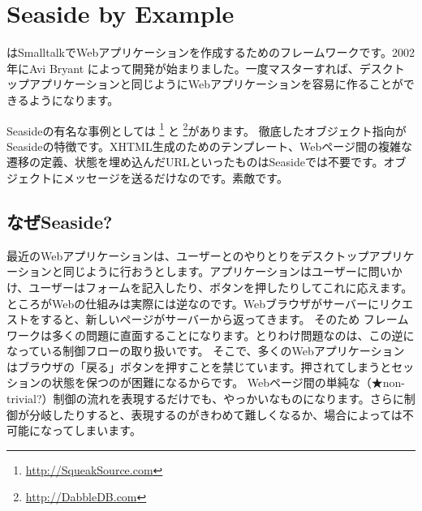 \documentclass[a4paper,10pt,twoside]{book}
\begin{document}
	\sloppy
\fi
\chapter{Seaside by Example}


 はSmalltalkでWebアプリケーションを作成するためのフレームワークです。2002年にAvi Bryant  によって開発が始まりました。一度マスターすれば、デスクトップアプリケーションと同じようにWebアプリケーションを容易に作ることができるようになります。

Seasideの有名な事例としては \footnote{\url{http://SqueakSource.com}} と \footnote{\url{http://DabbleDB.com}}があります。
徹底したオブジェクト指向がSeasideの特徴です。XHTML生成のためのテンプレート、Webページ間の複雑な遷移の定義、状態を埋め込んだURLといったものはSeasideでは不要です。オブジェクトにメッセージを送るだけなのです。素敵です。

\section{なぜSeaside?}

最近のWebアプリケーションは、ユーザーとのやりとりをデスクトップアプリケーションと同じように行おうとします。アプリケーションはユーザーに問いかけ、ユーザーはフォームを記入したり、ボタンを押したりしてこれに応えます。
ところがWebの仕組みは実際には逆なのです。Webブラウザがサーバーにリクエストをすると、新しいページがサーバーから返ってきます。
そのため フレームワークは多くの問題に直面することになります。とりわけ問題なのは、この逆になっている制御フローの取り扱いです。
そこで、多くのWebアプリケーションはブラウザの「戻る」ボタンを押すことを禁じています。押されてしまうとセッションの状態を保つのが困難になるからです。
Webページ間の単純な（★non-trivial?）制御の流れを表現するだけでも、やっかいなものになります。さらに制御が分岐したりすると、表現するのがきわめて難しくなるか、場合によっては不可能になってしまいます。

\end{document}
